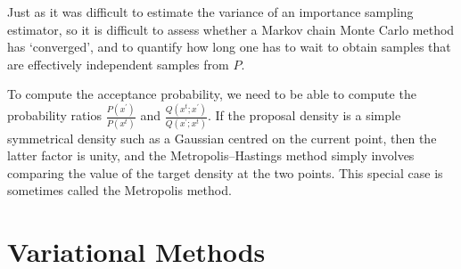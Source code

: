 \documentclass[10pt ]{article}
\begin{document}
Just as it was difficult to estimate the variance of an importance sampling estimator, so it is difficult to assess whether a Markov chain Monte Carlo method has `converged’, and to quantify how long one has to wait to obtain samples that are effectively independent samples from $P$.

To compute the acceptance probability, we need to be able to compute the probability ratios $\frac{P(x^{\prime})}{P(x^t)}$ and $\frac{Q(x^t;x^{\prime})}{Q(x^{\prime};x^t)}$. If the proposal density is a simple symmetrical density such as a Gaussian centred on the current point, then the latter factor is unity, and the Metropolis–Hastings method simply involves comparing the value of the target density at the two points. This special case is sometimes called the Metropolis method.

\section{Variational Methods}
\end{document}
